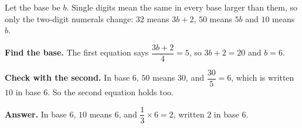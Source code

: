 Let the base be $b$. Single digits mean the same in every base larger than them, so only the two-digit numerals change: $32$ means $3b+2$, $50$ means $5b$ and $10$ means $b$.

\textbf{Find the base.} The first equation says $\dfrac{3b+2}{4}=5$, so $3b+2=20$ and $b=6$.

\textbf{Check with the second.} In base $6$, $50$ means $30$, and $\dfrac{30}{5}=6$, which is written $10$ in base $6$. So the second equation holds too.

\textbf{Answer.} In base $6$, $10$ means $6$, and $\dfrac{1}{3}\times6=2$, written $\boxed{2}$ in base $6$.
